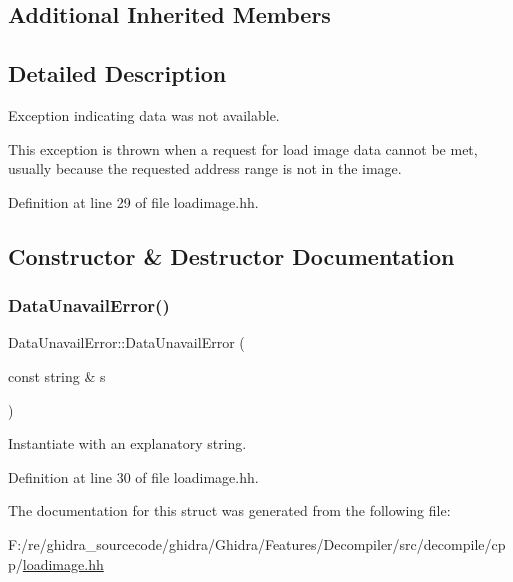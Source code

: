 \subsection*{Additional Inherited Members}


\subsection{Detailed Description}
Exception indicating data was not available. 

This exception is thrown when a request for load image data cannot be met, usually because the requested address range is not in the image. 

Definition at line 29 of file loadimage.\+hh.



\subsection{Constructor \& Destructor Documentation}
\mbox{\label{struct_data_unavail_error_a7f0121dd30d632c3ad343a824718f90d}} 
\subsubsection{\texorpdfstring{DataUnavailError()}{DataUnavailError()}}
{\footnotesize\ttfamily Data\+Unavail\+Error\+::\+Data\+Unavail\+Error (\begin{DoxyParamCaption}\item[{const string \&}]{s }\end{DoxyParamCaption})\hspace{0.3cm}{\ttfamily [inline]}}



Instantiate with an explanatory string. 



Definition at line 30 of file loadimage.\+hh.



The documentation for this struct was generated from the following file\+:\begin{DoxyCompactItemize}
\item 
F\+:/re/ghidra\+\_\+sourcecode/ghidra/\+Ghidra/\+Features/\+Decompiler/src/decompile/cpp/\mbox{\hyperlink{loadimage_8hh}{loadimage.\+hh}}\end{DoxyCompactItemize}
